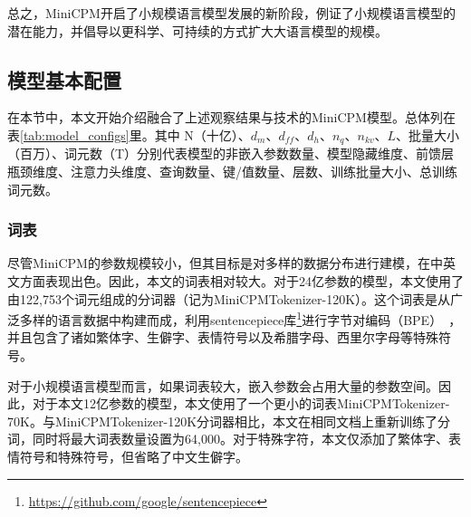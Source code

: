 总之，MiniCPM开启了小规模语言模型发展的新阶段，例证了小规模语言模型的潜在能力，并倡导以更科学、可持续的方式扩大大语言模型的规模。 



\subsection{模型基本配置}
在本节中，本文开始介绍融合了上述观察结果与技术的MiniCPM模型。总体列在表\ref{tab:model_configs}里。其中 N（十亿）、$d_m$、$d_{ff}$、$d_h$、$n_q$、$n_{kv}$、$L$、批量大小（百万）、词元数（T）分别代表模型的非嵌入参数数量、模型隐藏维度、前馈层瓶颈维度、注意力头维度、查询数量、键/值数量、层数、训练批量大小、总训练词元数。
\label{sec:model}
\begin{table}[htbp]
    \centering
{}
    \caption{MiniCPM的模型配置}
    \label{tab:model_configs}
\end{table}

\subsubsection{词表}
尽管MiniCPM的参数规模较小，但其目标是对多样的数据分布进行建模，在中英文方面表现出色。因此，本文的词表相对较大。对于24亿参数的模型，本文使用了由122,753个词元组成的分词器（记为MiniCPMTokenizer-120K）。这个词表是从广泛多样的语言数据中构建而成，利用sentencepiece库\footnote{\url{https://github.com/google/sentencepiece}}进行字节对编码（BPE）~\citep{sennrich-etal-2016-neural}，并且包含了诸如繁体字、生僻字、表情符号以及希腊字母、西里尔字母等特殊符号。

对于小规模语言模型而言，如果词表较大，嵌入参数会占用大量的参数空间。因此，对于本文12亿参数的模型，本文使用了一个更小的词表MiniCPMTokenizer-70K。与MiniCPMTokenizer-120K分词器相比，本文在相同文档上重新训练了分词，同时将最大词表数量设置为64,000。对于特殊字符，本文仅添加了繁体字、表情符号和特殊符号，但省略了中文生僻字。

